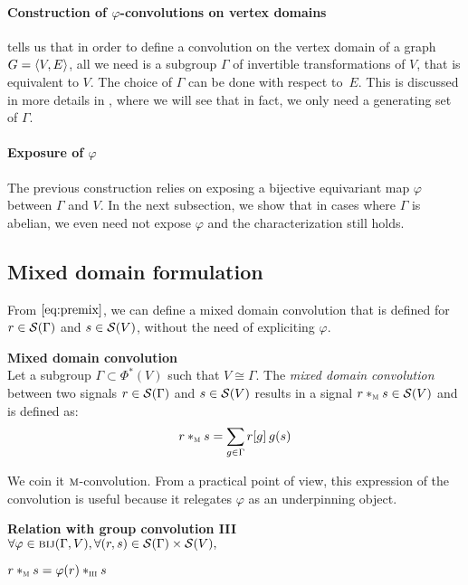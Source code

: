 \paragraph{Construction of $\varphi$-convolutions on vertex domains}
 tells us that in order to define a convolution on the vertex domain of a graph $\gve$, all we need is a subgroup $\Gamma$ of invertible transformations of $V$, that is equivalent to $V$. The choice of $\Gamma$ can be done with respect to~$E$. This is discussed in more details in , where we will see that in fact, we only need a generating set of $\Gamma$.

\paragraph{Exposure of $\varphi$}
The previous construction relies on exposing a bijective equivariant map $\varphi$ between $\Gamma$ and $V$. In the next subsection, we show that in cases where $\Gamma$ is abelian, we even need not expose $\varphi$ and the characterization still holds.

\subsection{Mixed domain formulation}

From $\eqref{eq:premix}$, we can define a mixed domain convolution \ie that is defined for $r \in \cs(\Gamma)$ and $s \in \cs(V)$, without the need of expliciting $\varphi$.

\begin{definition}\textbf{Mixed domain convolution}\\
Let a subgroup $\Gamma \subset \Phi^*(V)$ such that $V \cong \Gamma$.
The \emph{mixed domain convolution} between two signals $r \in \cs(\Gamma)$ and $s \in \cs(V)$ results in a signal $r \ast_{\M} s \in \cs(V)$ and is defined as:
\begin{gather*}
r \ast_{\M} s = \displaystyle \sum_{g \in \Gamma} r[g] \h{2} g(s)
\end{gather*}
\label{def:convm}
\end{definition}

We coin it $\M$-convolution. From a practical point of view, this expression of the convolution is useful because it relegates $\varphi$ as an underpinning object.%

\begin{lemma}\textbf{Relation with group convolution III}\\
$\forall \varphi \in \bij(\Gamma, V), \forall (r,s) \in \cs(\Gamma) \times \cs(V),$\\
\centerline{$r \ast_{\M} s = \varphi(r) \ast_{\III} s$}
\label{lem:rel3m}
\end{lemma}

